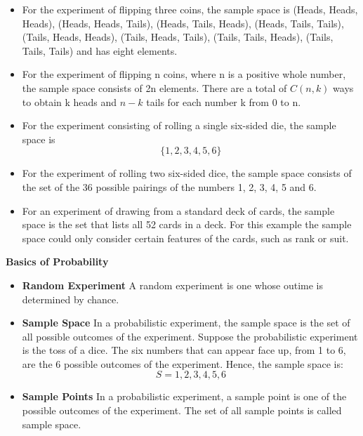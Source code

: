 \documentclass[]{report}
\begin{document}
{ 
\begin{itemize}

\item For the experiment of flipping three coins, the sample space is {(Heads, Heads, Heads), (Heads, Heads, Tails), (Heads, Tails, Heads), (Heads, Tails, Tails), (Tails, Heads, Heads), (Tails, Heads, Tails), (Tails, Tails, Heads), (Tails, Tails, Tails) } and has eight elements.


\item For the experiment of flipping n coins, where n is a positive whole number, the sample space consists of 2n elements. There are a total of $C(n, k)$ ways to obtain k heads and $n - k$ tails for each number k from 0 to n.

\item For the experiment consisting of rolling a single six-sided die, the sample space is 
\[\{1, 2, 3, 4, 5, 6\} \]
\end{itemize}
\smallskip
\begin{itemize}
\item For the experiment of rolling two six-sided dice, the sample space consists of the set of the 36 possible pairings of the numbers 1, 2, 3, 4, 5 and 6.
\item For an experiment of drawing from a standard deck of cards, the sample space is the set that lists all 52 cards in a deck. For this example the sample space could only consider certain features of the cards, such as rank or suit.
\end{itemize}

\noindent \textbf{Basics of Probability}
\begin{itemize}
\item \textbf{Random Experiment}
A random experiment is one whose outime is determined by chance.

\item \textbf{Sample Space}
In a probabilistic experiment, the sample space is the set of all possible outcomes of the experiment. 
Suppose the probabilistic experiment is the toss of a dice. The six numbers that can appear face up, 
from 1 to 6, are the 6 possible outcomes of the experiment. Hence, the sample space is:
\[S={1,2,3,4,5,6}\]

\item \textbf{Sample Points}
In a probabilistic experiment, a sample point is one of the possible outcomes of the experiment. The set of all sample points is called sample space.


\end{itemize}}
\end{document}
